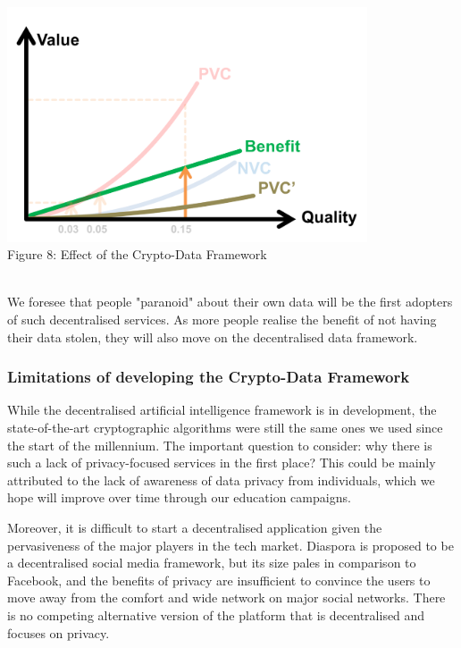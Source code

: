 \documentclass{icmmcm}
\begin{document}
\includegraphics[width=0.8\textwidth, center]{Picture6.png}
\\ \caption{Figure 8: Effect of the Crypto-Data Framework} \\

We foresee that people "paranoid" about their own data will be the first adopters of such decentralised services. As more people realise the benefit of not having their data stolen, they will also move on the decentralised data framework.


\subsubsection{Limitations of developing the Crypto-Data Framework}
While the decentralised artificial intelligence framework is in development, the state-of-the-art cryptographic algorithms were still the same ones we used since the start of the millennium. \citep{NIST} The important question to consider: why there is such a lack of privacy-focused services in the first place? This could be mainly attributed to the lack of awareness of data privacy from individuals, which we hope will improve over time through our education campaigns.

Moreover, it is difficult to start a decentralised application given the pervasiveness of the major players in the tech market. Diaspora \citep{disapora} is proposed to be a decentralised social media framework, but its size pales in comparison to Facebook, and the benefits of privacy are insufficient to convince the users to move away from the comfort and wide network on major social networks. There is no competing alternative version of the platform that is decentralised and focuses on privacy.
\end{document}
